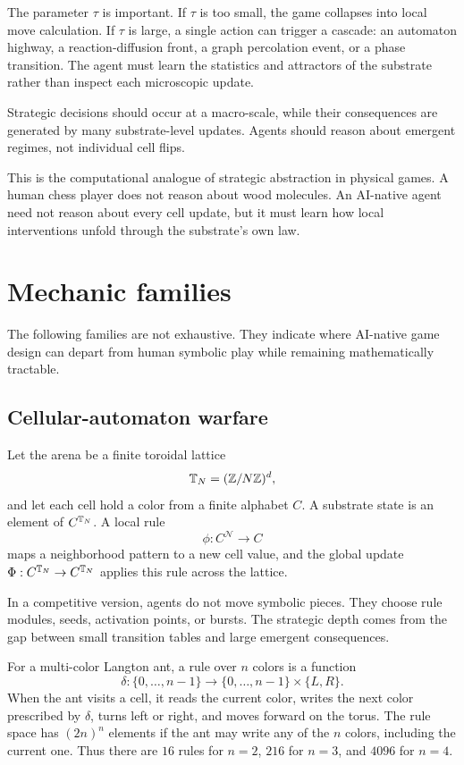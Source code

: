 The parameter $\tau$ is important. If $\tau$ is too small, the game collapses into local move calculation. If $\tau$ is large, a single action can trigger a cascade: an automaton highway, a reaction-diffusion front, a graph percolation event, or a phase transition. The agent must learn the statistics and attractors of the substrate rather than inspect each microscopic update.

\begin{principle}\label{prin:bursts}
Strategic decisions should occur at a macro-scale, while their consequences are generated by many substrate-level updates. Agents should reason about emergent regimes, not individual cell flips.
\end{principle}

This is the computational analogue of strategic abstraction in physical games. A human chess player does not reason about wood molecules. An AI-native agent need not reason about every cell update, but it must learn how local interventions unfold through the substrate's own law.

\section{Mechanic families}\label{sec:mechanics}

The following families are not exhaustive. They indicate where AI-native game design can depart from human symbolic play while remaining mathematically tractable.

\subsection{Cellular-automaton warfare}\label{subsec:ca}

Let the arena be a finite toroidal lattice
\[
  \mathbb{T}_N=(\mathbb{Z}/N\mathbb{Z})^d,
\]
and let each cell hold a color from a finite alphabet $C$. A substrate state is an element of $C^{\mathbb{T}_N}$. A local rule
\[
  \phi:C^{\mathcal{N}}\to C
\]
maps a neighborhood pattern to a new cell value, and the global update $\Phi:C^{\mathbb{T}_N}\to C^{\mathbb{T}_N}$ applies this rule across the lattice.

In a competitive version, agents do not move symbolic pieces. They choose rule modules, seeds, activation points, or bursts. The strategic depth comes from the gap between small transition tables and large emergent consequences.

\begin{example}\label{ex:langton}
For a multi-color Langton ant, a rule over $n$ colors is a function
\[
  \delta:\{0,\ldots,n-1\}\to \{0,\ldots,n-1\}\times\{L,R\}.
\]
When the ant visits a cell, it reads the current color, writes the next color prescribed by $\delta$, turns left or right, and moves forward on the torus. The rule space has $(2n)^n$ elements if the ant may write any of the $n$ colors, including the current one. Thus there are $16$ rules for $n=2$, $216$ for $n=3$, and $4096$ for $n=4$.
\end{example}

